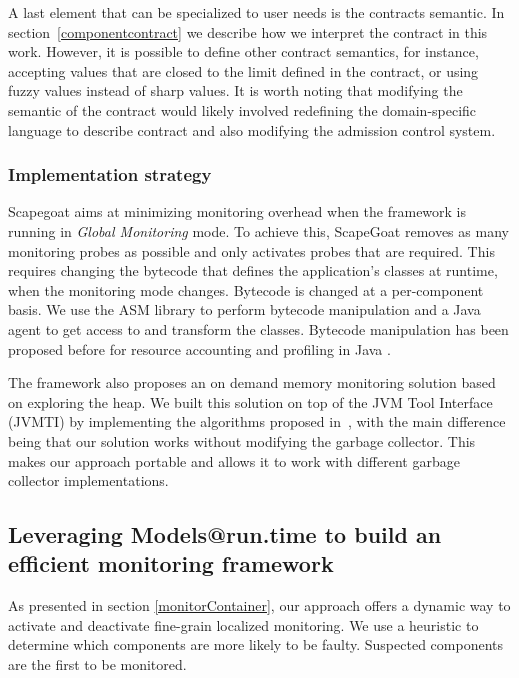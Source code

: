 A last element that can be specialized to user needs is the contracts semantic.
In section~\ref{componentcontract} we describe how we interpret the contract in this work.
However, it is possible to define other contract semantics, for instance, accepting values that are closed to the limit defined in the contract, or using fuzzy values instead of sharp values.
It is worth noting that modifying the semantic of the contract would likely involved redefining the domain-specific language to describe contract and also modifying the admission control system.

\subsubsection{Implementation strategy}
Scapegoat aims at minimizing monitoring overhead when the framework is running in \textit{Global Monitoring} mode. 
To achieve this, ScapeGoat removes as many monitoring probes as possible and only activates probes that are required.
This requires changing the bytecode that defines the application's classes at runtime, when the monitoring mode changes.
Bytecode is changed at a per-component basis.
We use the ASM library to perform bytecode manipulation and a Java agent to get access to and transform the classes.
Bytecode manipulation has been proposed before for resource accounting and profiling in Java \cite{binder_portable_2006,Binder200645,czajkowski_jres:_1998}.

The framework also proposes an on demand memory monitoring solution based on exploring the heap.
We built this solution on top of the JVM Tool Interface (JVMTI) by implementing the algorithms proposed in~\cite{Price:2003:GCM:829515.830545, Geoffray5270296}, with the main difference being that our solution works without modifying the garbage collector.
This makes our approach portable and allows it to work with different garbage collector implementations. 

\subsection{Leveraging Models@run.time to build an efficient monitoring framework}\label{sec:heuristic-based-on-modeling}

As presented in section \ref{monitorContainer}, our approach offers a dynamic way to activate and deactivate fine-grain localized monitoring.
We use a heuristic to determine which components are more likely to be faulty.
Suspected components are the first to be monitored.

